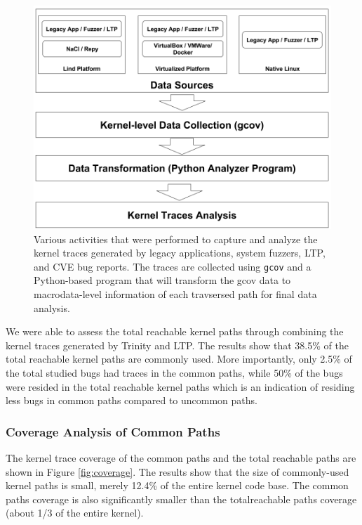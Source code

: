 \begin{figure}%
\centering
\includegraphics[width=1.0\columnwidth]{diagram/data_collection.png}
\caption{Various activities that were performed to capture and analyze the kernel
 traces generated by legacy applications, system fuzzers, LTP, and CVE bug
 reports. The traces are collected using \texttt{gcov} and a Python-based program that will transform the gcov data to macrodata-level information of each travsersed path for final data analysis.}

\label{fig:datacollection}
\end{figure}

We were able to assess the total reachable kernel paths through combining the kernel traces generated by Trinity and LTP. The results show that 38.5\% of the total reachable
kernel paths are commonly used. More importantly, only 2.5\% of the total studied bugs had traces in the common paths, while 50\% of the bugs were resided in the total reachable kernel paths which is an indication of residing less bugs in common paths compared to uncommon paths.
 

\subsubsection{Coverage Analysis of Common Paths}

The kernel trace coverage of the common paths and the total reachable paths
are shown in Figure \ref{fig:coverage}. The results show that the size of commonly-used kernel paths is small,
merely 12.4\% of the entire kernel code base. The common paths coverage is also significantly smaller than the totalreachable paths coverage (about 1/3 of the entire kernel).

